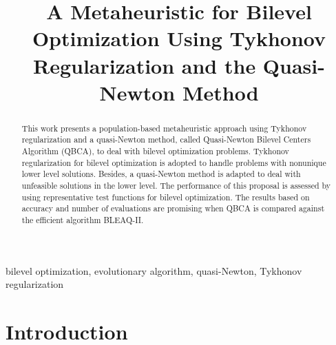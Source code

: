 \documentclass[conference]{IEEEtran}
\theoremstyle{definition}
\begin{document}
\title{A Metaheuristic for Bilevel Optimization Using Tykhonov Regularization and the Quasi-Newton Method}

\author{
\and
{}
}

\maketitle

\begin{abstract}
This work presents a population-based metaheuristic approach using Tykhonov
regularization and a quasi-Newton method, called Quasi-Newton Bilevel Centers
Algorithm (QBCA), to deal with bilevel optimization problems. Tykhonov regularization
for bilevel optimization is adopted to handle problems with nonunique lower level
solutions. Besides, a quasi-Newton method is adapted to deal with unfeasible solutions
in the lower level. The performance of this proposal is assessed by using representative
test functions for bilevel optimization. The results based on accuracy and number
of evaluations are promising when QBCA is compared against the efficient algorithm
BLEAQ-II.
\end{abstract}

\begin{IEEEkeywords}
bilevel optimization, evolutionary algorithm, quasi-Newton, Tykhonov regularization
\end{IEEEkeywords}


\section{Introduction} %
\label{sec:introduction}

\end{document}
